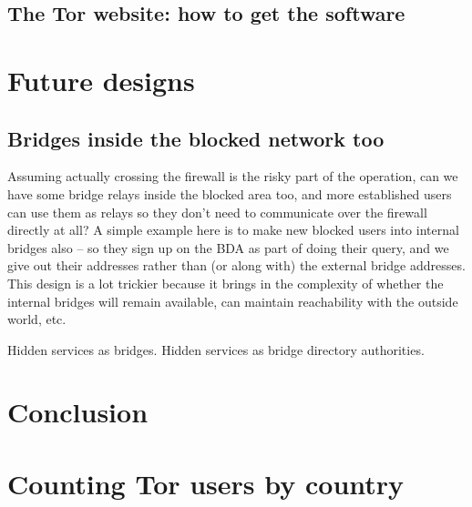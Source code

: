 \documentclass{llncs}
\begin{document}
\subsection{The Tor website: how to get the software}



\section{Future designs}

\subsection{Bridges inside the blocked network too}

Assuming actually crossing the firewall is the risky part of the
operation, can we have some bridge relays inside the blocked area too,
and more established users can use them as relays so they don't need to
communicate over the firewall directly at all? A simple example here is
to make new blocked users into internal bridges also -- so they sign up
on the BDA as part of doing their query, and we give out their addresses
rather than (or along with) the external bridge addresses. This design
is a lot trickier because it brings in the complexity of whether the
internal bridges will remain available, can maintain reachability with
the outside world, etc.

Hidden services as bridges. Hidden services as bridge directory authorities.

\section{Conclusion}

 

\appendix

\section{Counting Tor users by country}
\label{app:geoip}
\end{document}
